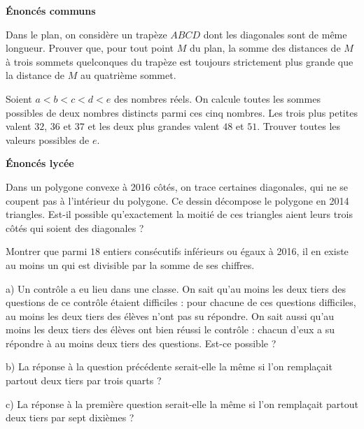 \bigskip
{\bf\large \'Enonc\'es communs}
\par\medskip

\begin{exo}
 Dans le plan, on consid\`{e}re un trap\`{e}ze $ABCD$ dont les diagonales sont de m\^{e}me longueur. Prouver que, pour tout point $M$ du plan, la somme des distances de $M$ \`{a} trois sommets quelconques du trap\`{e}ze est toujours strictement plus grande que la distance de $M$ au quatri\`{e}me sommet.
\end{exo}

\begin{exo}
Soient $a<b<c<d<e$ des nombres r\'eels. On calcule toutes les sommes possibles de deux nombres distincts parmi ces cinq nombres. Les trois plus petites valent $32$, $36$ et $37$ et les deux plus grandes valent $48$ et $51$. Trouver toutes les valeurs possibles de $e$.
\end{exo}

\bigskip
{\bf\large \'Enonc\'es lyc\'ee}
\par\medskip

\begin{exo}
 Dans un polygone convexe \`a 2016 c\^ot\'es, on trace certaines diagonales, qui ne se
coupent pas \`a l'int\'erieur du polygone. Ce dessin d\'ecompose le polygone en 2014 triangles. Est-il
possible qu'exactement la moiti\'e de ces triangles aient leurs trois c\^ot\'es qui soient des diagonales ?
\end{exo}

\begin{exo}
 Montrer que parmi $18$ entiers cons\'ecutifs inf\'erieurs ou \'egaux \`a 2016, il en existe au moins un qui est divisible
par la somme de ses chiffres.
\end{exo}

\begin{exo}
 a) Un contr\^ole a eu lieu dans une classe. On sait qu'au moins les deux tiers des questions de ce
contr\^ole \'etaient difficiles : pour chacune de ces questions difficiles, au moins les deux tiers des
\'el\`eves n'ont pas su r\'epondre. On sait aussi qu'au moins les deux tiers des \'el\`eves ont bien r\'eussi
le contr\^ole : chacun d'eux a su r\'epondre \`a au moins deux tiers des questions. Est-ce possible ?

b) La r\'eponse \`a la question pr\'ec\'edente serait-elle la m\^eme si l'on rempla\c{c}ait partout deux tiers
par trois quarts ?

c) La r\'eponse \`a la premi\`ere question serait-elle la m\^eme si l'on rempla\c{c}ait partout deux tiers par
sept dixi\`emes ?
\end{exo}

